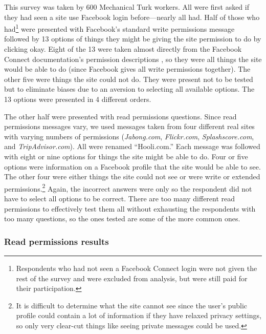 \documentclass{sig-alternate}
\newcommand{\extendedversion}[2]{#2}
\begin{document}
This survey was taken by 600 Mechanical Turk workers. All were first asked if they had seen a site use Facebook login before---nearly all had. Half of those who had\footnote{Respondents who had not seen a Facebook Connect login were not given the rest of the survey and were excluded from analysis, but were still paid for their participation.} were presented with Facebook's standard write permissions message followed by 13 options of things they might be giving the site permission to do by clicking okay. Eight of the 13 were taken almost directly from the Facebook Connect documentation's permission descriptions \cite{fbpermissions}, so they were all things the site would be able to do (since Facebook gives all write permissions together). The other five were things the site could not do. They were present not to be tested but to eliminate biases due to an aversion to selecting all available options. The 13 options were presented in 4 different orders\extendedversion{ and can be seen in Appendix~\ref{appendix:writesurveys}.}{.}

The other half were presented with read permissions questions. Since read permissions messages vary, we used messages taken from four different real sites with varying numbers of permissions (\emph{Jabong.com}, \emph{Flickr.com}, \emph{Splashscore.com}, and \emph{TripAdvisor.com}). All were renamed ``Hooli.com.'' Each message was followed with eight or nine options for things the site might be able to do. Four or five options were information on a Facebook profile that the site would be able to see. The other four were either things the site could not see or were write or extended permissions.\footnote{It is difficult to determine what the site cannot see since the user's public profile could contain a lot of information if they have relaxed privacy settings, so only very clear-cut things like seeing private messages could be used.} Again, the incorrect answers were only so the respondent did not have to select all options to be correct. \extendedversion{The four different questions can be seen in Appendix~\ref{appendix:readsurveys}.}{} There are too many different read permissions to effectively test them all without exhausting the respondents with too many questions, so the ones tested are some of the more common ones.

\subsubsection{Read permissions results}
\end{document}
